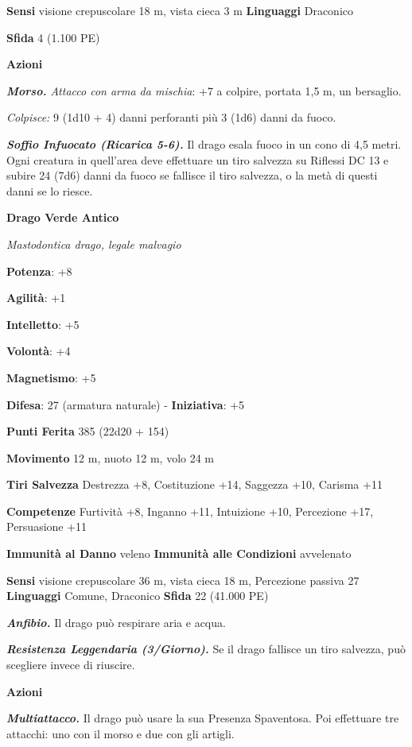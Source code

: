\begin{multicols}{2}
\textbf{Sensi} visione crepuscolare 18 m, vista cieca 3 m
\textbf{Linguaggi} Draconico

\textbf{Sfida} 4 (1.100 PE)

\textbf{Azioni}

\emph{\textbf{Morso.} Attacco con arma da mischia}: +7 a colpire,
portata 1,5 m, un bersaglio.

\emph{Colpisce:} 9 (1d10 + 4) danni perforanti più 3 (1d6) danni da
fuoco.

\emph{\textbf{Soffio Infuocato (Ricarica 5-6).}} Il drago esala fuoco in
un cono di 4,5 metri. Ogni creatura in quell'area deve effettuare un
tiro salvezza su Riflessi DC 13 e subire 24 (7d6) danni da fuoco se
fallisce il tiro salvezza, o la metà di questi danni se lo riesce.

\textbf{Drago Verde Antico}

\emph{Mastodontica drago, legale malvagio}

\textbf{Potenza}: +8

\textbf{Agilità}: +1

\textbf{Intelletto}: +5

\textbf{Volontà}: +4

\textbf{Magnetismo}: +5

\textbf{Difesa}: 27 (armatura naturale) - \textbf{Iniziativa}: +5

\textbf{Punti Ferita} 385 (22d20 + 154)

\textbf{Movimento} 12 m, nuoto 12 m, volo 24 m

\textbf{Tiri Salvezza} Destrezza +8, Costituzione +14, Saggezza +10,
Carisma +11

\textbf{Competenze} Furtività +8, Inganno +11, Intuizione +10, Percezione
+17, Persuasione +11

\textbf{Immunità al Danno} veleno \textbf{Immunità alle Condizioni}
avvelenato

\textbf{Sensi} visione crepuscolare 36 m, vista cieca 18 m, Percezione passiva
27 \textbf{Linguaggi} Comune, Draconico \textbf{Sfida} 22 (41.000 PE)

\emph{\textbf{Anfibio.}} Il drago può respirare aria e acqua.

\emph{\textbf{Resistenza Leggendaria (3/Giorno).}} Se il drago fallisce
un tiro salvezza, può scegliere invece di riuscire.

\textbf{Azioni}

\emph{\textbf{Multiattacco.}} Il drago può usare la sua Presenza
Spaventosa. Poi effettuare tre attacchi: uno con il morso e due con gli
artigli.


\end{multicols}

